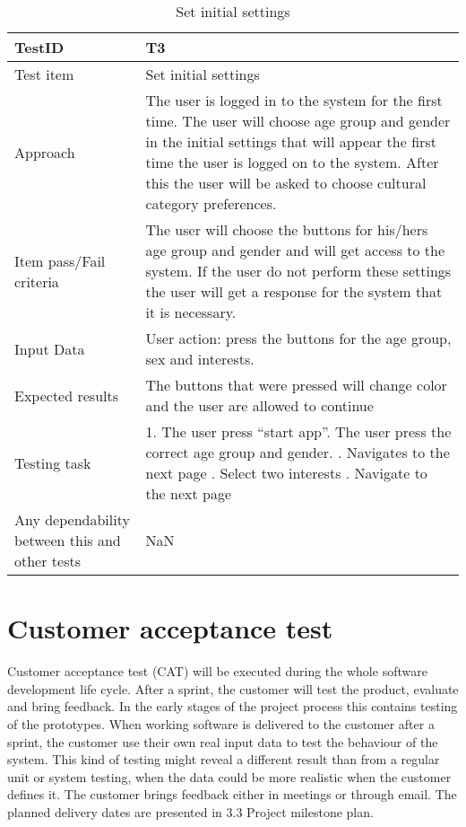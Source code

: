 \begin{table}[!h]
	\begin{center}
		\begin{tabular}{| p{5cm} | p{12cm} |}
			\hline
			TestID & T3 \\ \hline
			Test item & Set initial settings  \\ \hline
			
			Approach & The user is logged in to the system for the first time. The user will choose age group and gender in the initial settings that will appear the first time the user is logged on to the system. After this the user will be asked to choose cultural category preferences.   \\ \hline
			
			Item pass/Fail criteria & The user will choose the buttons for his/hers age group and gender and will get access to the system. If the user do not perform these settings the user will get a response for the system that it is necessary.  \\ \hline
			
			Input Data & User action: press the buttons for the age group, sex and interests.   \\ \hline
			
			Expected results & The buttons that were pressed will change color and the user are allowed to continue   \\ \hline
			
			Testing task & 1. The user press “start app”\newline 2. The user press the correct age group and gender. \newline
			3. Navigates to the next page \newline 4. Select two interests \newline 5. Navigate to the next page  \\ \hline
			
			Any dependability between this and other tests & NaN \\ \hline
		\end{tabular}
	\end{center}
	\caption{Set initial settings}
	\label{Tab_systemtest2}
\end{table}

\section{Customer acceptance test}

Customer acceptance test (CAT) will be executed during the whole software development life cycle. After a sprint, the customer will test the product, evaluate and bring feedback. In the early stages of the project process this contains testing of the prototypes. When working software is delivered to the customer after a sprint, the customer use their own real input data to test the behaviour of the system. This kind of testing might reveal a different result than from a regular unit or system testing, when the data could be more realistic when the customer defines it. The customer brings feedback either in meetings or through email. The planned delivery dates are presented in 3.3 Project milestone plan.  


